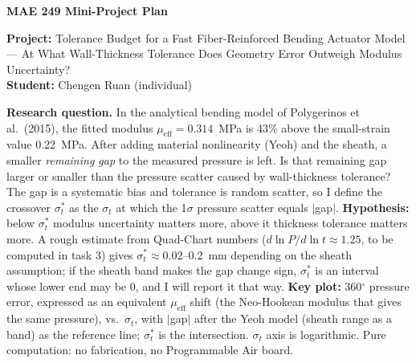 \documentclass[12pt,letterpaper]{article}
\newcommand{\meff}{\mu_{\mathrm{eff}}}
\begin{document}
{\Large\bfseries MAE 249 Mini-Project Plan}\par
\textbf{Project:} Tolerance Budget for a Fast Fiber-Reinforced Bending Actuator Model --- At What Wall-Thickness Tolerance Does Geometry Error Outweigh Modulus Uncertainty?\\
\textbf{Student:} Chengen Ruan (individual)

\small
\textbf{Research question.} In the analytical bending model of Polygerinos et al.\ (2015), the fitted modulus $\meff=0.314$~MPa is 43\% above the small-strain value 0.22~MPa. After adding material nonlinearity (Yeoh) and the sheath, a smaller \emph{remaining gap} to the measured pressure is left. Is that remaining gap larger or smaller than the pressure scatter caused by wall-thickness tolerance? The gap is a systematic bias and tolerance is random scatter, so I define the crossover $\sigma_t^*$ as the $\sigma_t$ at which the 1$\sigma$ pressure scatter equals $|$gap$|$. \textbf{Hypothesis:} below $\sigma_t^*$ modulus uncertainty matters more, above it thickness tolerance matters more. A rough estimate from Quad-Chart numbers ($d\ln P/d\ln t\approx1.25$, to be computed in task 3) gives $\sigma_t^*\approx0.02$--0.2~mm depending on the sheath assumption; if the sheath band makes the gap change sign, $\sigma_t^*$ is an interval whose lower end may be 0, and I will report it that way.
\textbf{Key plot:} 360$^\circ$ pressure error, expressed as an equivalent $\meff$ shift (the Neo-Hookean modulus that gives the same pressure), vs.\ $\sigma_t$, with $|$gap$|$ after the Yeoh model (sheath range as a band) as the reference line; $\sigma_t^*$ is the intersection. $\sigma_t$ axis is logarithmic. Pure computation: no fabrication, no Programmable Air board.
\end{document}
